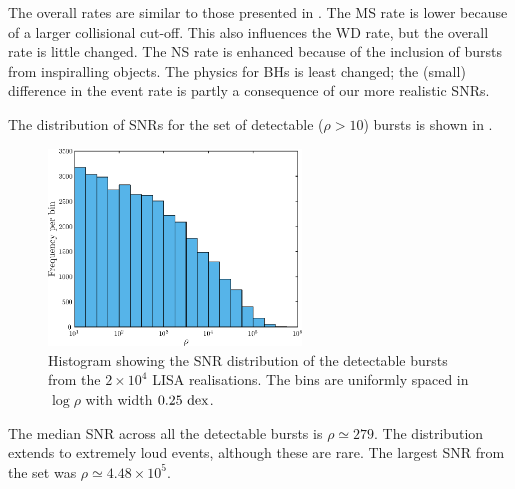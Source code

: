The overall rates are similar to those presented in \citet{Hopman2007}. The MS rate is lower because of a larger collisional cut-off. This also influences the WD rate, but the overall rate is little changed. The NS rate is enhanced because of the inclusion of bursts from inspiralling objects. The physics for BHs is least changed; the (small) difference in the event rate is partly a consequence of our more realistic SNRs.

The distribution of SNRs for the set of detectable ($\rho > 10$) bursts is shown in .
\begin{figure}%
\centering
   \includegraphics[width=0.6\textwidth]{./images/Fig_Detect_SNR_hist}
\caption{Histogram showing the SNR distribution of the detectable bursts from the $2 \times 10^4$ LISA realisations. The bins are uniformly spaced in $\log\rho$ with width $0.25~\mathrm{dex}$.}
\label{fig:SNR-hist-eLISA}
\end{figure}
The median SNR across all the detectable bursts is $\rho \simeq 279$. The distribution extends to extremely loud events, although these are rare. The largest SNR from the set was $\rho \simeq 4.48 \times 10^5$. %


